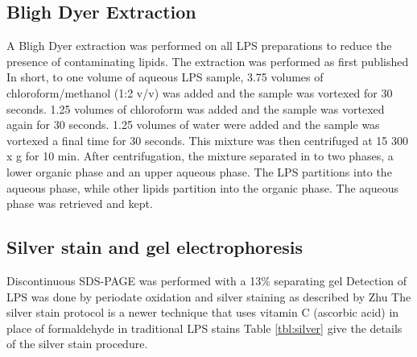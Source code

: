 	\subsection{Bligh Dyer Extraction} %
	\label{sub:bligh_dyer_extraction}
		A Bligh Dyer extraction was performed on all \ac{LPS} preparations to reduce the presence of contaminating lipids. The extraction was performed as first published In short,  to one volume of aqueous \ac{LPS} sample, 3.75 volumes of chloroform/methanol (1:2 v/v) was added and the sample was vortexed for 30 seconds. 1.25 volumes of chloroform was added and the sample was vortexed again for 30 seconds. 1.25 volumes of water were added and the sample was vortexed a final time for 30 seconds. This mixture was then centrifuged at 15 300 x g for 10 min. After centrifugation, the mixture separated in to two phases, a lower organic phase and an upper aqueous phase. The \ac{LPS} partitions into the aqueous phase, while other lipids partition into the organic phase. The aqueous phase was retrieved and kept.

	\subsection{Silver stain and gel electrophoresis} %
	\label{sub:gel_electrophoresis}

		Discontinuous \ac{SDS-PAGE} was performed with a 13\% separating gel Detection of \ac{LPS} was done by periodate oxidation and silver staining as described by Zhu \etal\! The silver stain protocol is a newer technique that uses vitamin C (ascorbic acid) in place of formaldehyde in traditional \ac{LPS} stains Table \ref{tbl:silver} give the details of the silver stain procedure.

